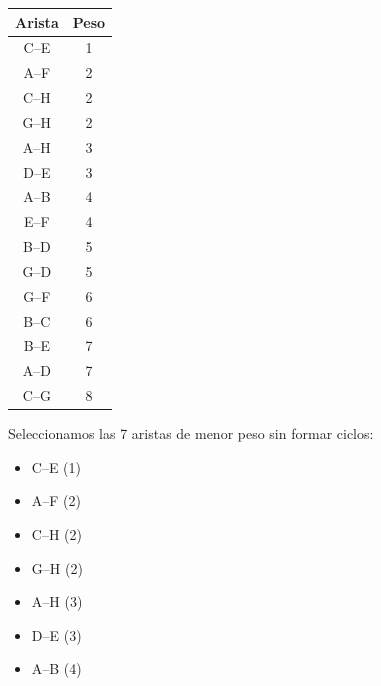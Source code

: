 \documentclass[12pt]{article}
\begin{document}
\begin{enumerate}
\begin{enumerate}[label=\alph*)]
                \begin{center}
                    \begin{tabular}{|c|c|}
                        \hline
                        \textbf{Arista} & \textbf{Peso} \\
                        \hline
                        C--E & 1 \\
                        \hline
                        A--F & 2 \\
                        \hline
                        C--H & 2 \\
                        \hline
                        G--H & 2 \\
                        \hline
                        A--H & 3 \\
                        \hline
                        D--E & 3 \\
                        \hline
                        A--B & 4 \\
                        \hline
                        E--F & 4 \\
                        \hline
                        B--D & 5 \\
                        \hline
                        G--D & 5 \\
                        \hline
                        G--F & 6 \\
                        \hline
                        B--C & 6 \\
                        \hline
                        B--E & 7 \\
                        \hline
                        A--D & 7 \\
                        \hline
                        C--G & 8 \\
                        \hline
                    \end{tabular}
                \end{center} 

                Seleccionamos las 7 aristas de menor peso sin formar ciclos:
                \begin{itemize}
                    \item C--E (1)
                    \item A--F (2)
                    \item C--H (2)
                    \item G--H (2)
                    \item A--H (3)
                    \item D--E (3)
                    \item A--B (4)
                \end{itemize}


\end{enumerate}
\end{enumerate}
\end{document}
